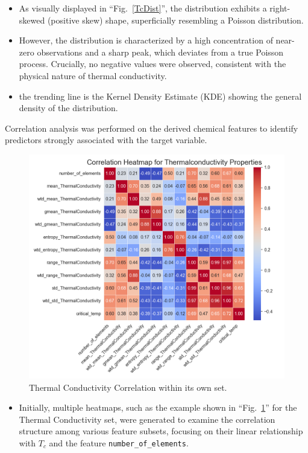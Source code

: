 \documentclass[conference]{IEEEtran}
\begin{document}
\begin{itemize}
	\item As visually displayed in ``Fig.~\ref{TcDist}'', the distribution exhibits a right-skewed (positive skew) shape, superficially resembling a Poisson distribution.
	\item However, the distribution is characterized by a high concentration of near-zero observations and a sharp peak, which deviates from a true Poisson process. Crucially, no negative values were observed, consistent with the physical nature of thermal conductivity.
	\item the trending line is the Kernel Density Estimate (KDE) showing the general density of the distribution.\\
\end{itemize}

Correlation analysis was performed on the derived chemical features to identify predictors strongly associated with the target variable.
\begin{figure}[htbp]
	\centerline{\includegraphics[scale=0.4]{ThermalConductivity_heatmap.png}}
	\caption{Thermal Conductivity Correlation within its own set.}
	\label{ThcCorr}
\end{figure}
\begin{itemize}
	\item Initially, multiple heatmaps, such as the example shown in ``Fig.~\ref{ThcCorr}'' for the Thermal Conductivity set, were generated to examine the correlation structure among various feature subsets, focusing on their linear relationship with $T_c$ and the feature \texttt{number\_of\_elements}.
\end{itemize}
\end{document}
